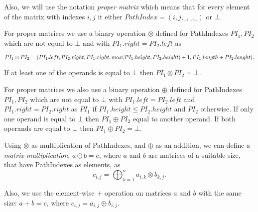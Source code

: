 Also, we will use the notation \textit{proper matrix} which means that for every element of the matrix with indexes $i,j$ it either $PathIndex = (i,j,\_,\_,\_)$ or $\bot$.

For proper matrices we use a binary operation $\otimes$ defined for PathIndexes \mbox{$PI_1, PI_2$} which are not equal to $\bot$ and with $PI_1.right = PI_2.left$ as 

$PI_1 \otimes PI_2 = (PI_1.left, PI_2.right, PI_1.right, \\ max(PI_1.height, PI_2.height)+1,PI_1.length + PI_2.lenght).$

If at least one of the operands is equal to $\bot$ then $PI_1 \otimes PI_2 = \bot$.

For proper matrices we also use a binary operation $\oplus$ defined for PathIndexes \mbox{$PI_1, PI_2$} which are not equal to $\bot$ with $PI_1.left = PI_2.left$ and $PI_1.right = PI_2.right$ as $PI_1$ if $PI_1.height \leq PI_2.height$ and $PI_2$ otherwise. If only one operand is equal to $\bot$ then $PI_1 \oplus PI_2$ equal to another operand. If both operands are equal to $\bot$ then $PI_1 \oplus PI_2 = \bot$.

Using $\otimes$ as multiplication of PathIndexes, and $\oplus$ as an addition, we can define a \emph{matrix multiplication}, \mbox{$a \odot b = c$}, where $a$ and $b$ are matrices of a suitable size, that have PathIndexes as elements, as $$c_{i,j} = \bigoplus^{n}_{k=1}{a_{i,k} \otimes b_{k,j}}.$$

Also, we use the element-wise $+$ operation on matrices $a$ and $b$ with the same size: \mbox{$a + b = c$}, where $c_{i,j} = a_{i,j} \oplus b_{i,j}.$
